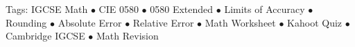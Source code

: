 \documentclass[11pt,a4paper]{article}
\begin{document}
\vspace{14pt}
\begin{center}
  \sffamily\scriptsize\textcolor{textmuted}{
    Tags: IGCSE Math $\bullet$ CIE 0580 $\bullet$ 0580 Extended $\bullet$ Limits of Accuracy $\bullet$ Rounding $\bullet$ Absolute Error $\bullet$ Relative Error $\bullet$ Math Worksheet $\bullet$ Kahoot Quiz $\bullet$ Cambridge IGCSE $\bullet$ Math Revision
  }
\end{center}
\end{document}
